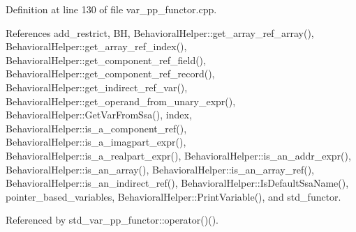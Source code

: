 Definition at line 130 of file var\+\_\+pp\+\_\+functor.\+cpp.



References add\+\_\+restrict, BH, Behavioral\+Helper\+::get\+\_\+array\+\_\+ref\+\_\+array(), Behavioral\+Helper\+::get\+\_\+array\+\_\+ref\+\_\+index(), Behavioral\+Helper\+::get\+\_\+component\+\_\+ref\+\_\+field(), Behavioral\+Helper\+::get\+\_\+component\+\_\+ref\+\_\+record(), Behavioral\+Helper\+::get\+\_\+indirect\+\_\+ref\+\_\+var(), Behavioral\+Helper\+::get\+\_\+operand\+\_\+from\+\_\+unary\+\_\+expr(), Behavioral\+Helper\+::\+Get\+Var\+From\+Ssa(), index, Behavioral\+Helper\+::is\+\_\+a\+\_\+component\+\_\+ref(), Behavioral\+Helper\+::is\+\_\+a\+\_\+imagpart\+\_\+expr(), Behavioral\+Helper\+::is\+\_\+a\+\_\+realpart\+\_\+expr(), Behavioral\+Helper\+::is\+\_\+an\+\_\+addr\+\_\+expr(), Behavioral\+Helper\+::is\+\_\+an\+\_\+array(), Behavioral\+Helper\+::is\+\_\+an\+\_\+array\+\_\+ref(), Behavioral\+Helper\+::is\+\_\+an\+\_\+indirect\+\_\+ref(), Behavioral\+Helper\+::\+Is\+Default\+Ssa\+Name(), pointer\+\_\+based\+\_\+variables, Behavioral\+Helper\+::\+Print\+Variable(), and std\+\_\+functor.



Referenced by std\+\_\+var\+\_\+pp\+\_\+functor\+::operator()().

